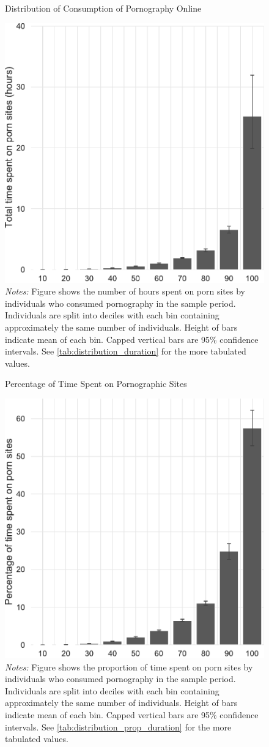 \documentclass[12pt, letterpaper]{article}
\begin{document}
\begin{figure}[ht]
\centering
\caption{Distribution of Consumption of Pornography Online}
\includegraphics[width=.5\linewidth]{../figs/distribution_duration_on_adultsites.pdf}
\caption*{\footnotesize \emph{Notes:} 
	Figure shows the number of hours spent on porn sites by individuals who consumed pornography in the sample period.
	Individuals are split into deciles with each bin containing approximately the same number of individuals.
	Height of bars indicate mean of each bin.
	Capped vertical bars are 95\% confidence intervals.
	See \cref{tab:distribution_duration} for the more tabulated values.
}
\label{fig:distribution_duration}
\end{figure}

\begin{figure}[ht]
	\centering
	\caption{Percentage of Time Spent on Pornographic Sites}
	\includegraphics[width=.5\linewidth]{../figs/distribution_proportion_duration_on_adultsites.pdf}
	\caption*{\footnotesize \emph{Notes:} 
		Figure shows the proportion of time spent on porn sites by individuals who consumed pornography in the sample period.
		Individuals are split into deciles with each bin containing approximately the same number of individuals.
		Height of bars indicate mean of each bin.
		Capped vertical bars are 95\% confidence intervals.
		See \cref{tab:distribution_prop_duration} for the more tabulated values.
	}
	\label{fig:distribution_prop_duration}
\end{figure}
\end{document}
